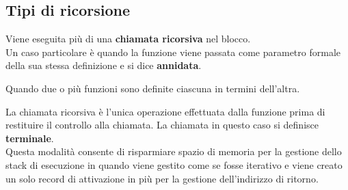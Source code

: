 \subsection{Tipi di ricorsione}
\begin{definition}
	Viene eseguita più di una \textbf{chiamata ricorsiva} nel blocco. \\
	Un caso particolare è quando la funzione viene passata come parametro formale della sua stessa definizione e si dice \textbf{annidata}.
\end{definition}
\begin{definition}[Mutua]
	Quando due o più funzioni sono definite ciascuna in termini dell'altra.
\end{definition}
\begin{definition}[In coda]
	La chiamata ricorsiva è l'unica operazione effettuata dalla funzione prima di restituire il controllo alla chiamata. La chiamata in questo caso si definisce \textbf{terminale}.\\ Questa modalità consente di risparmiare spazio di memoria per la gestione dello stack di esecuzione in quando viene gestito come se fosse iterativo e viene creato un solo record di attivazione in più per la gestione dell'indirizzo di ritorno.
\end{definition}